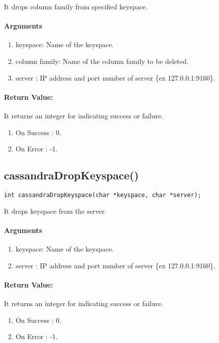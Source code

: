 \documentclass[12 pt , a4paper ]{report}
\begin{document}
  It drops  column family from specified keyspace.

  \paragraph{Arguments}
  \begin{enumerate}
   \item keyspace: Name of the keyspace.
   \item column family: Name of the column family to be deleted.
   \item server : IP address and port number of server \{ex 127.0.0.1:9160\}.
  \end{enumerate}

 \paragraph{Return Value:}
 It returns an integer  for indicating success or failure.
\begin{enumerate}
 \item On Success : 0.
 \item On Error   : -1.
\end{enumerate}

\subsection{cassandraDropKeyspace()}
\begin{verbatim}
int cassandraDropKeyspace(char *keyspace, char *server);
\end{verbatim}

  It drops  keyspace from the server.

  \paragraph{Arguments}
  \begin{enumerate}
   \item keyspace: Name of the keyspace.
   \item server : IP address and port number of server \{ex 127.0.0.1:9160\}.
  \end{enumerate}

 \paragraph{Return Value:}
 It returns an integer  for indicating success or failure.
\begin{enumerate}
 \item On Success : 0.
 \item On Error   : -1.
\end{enumerate}
\end{document}

